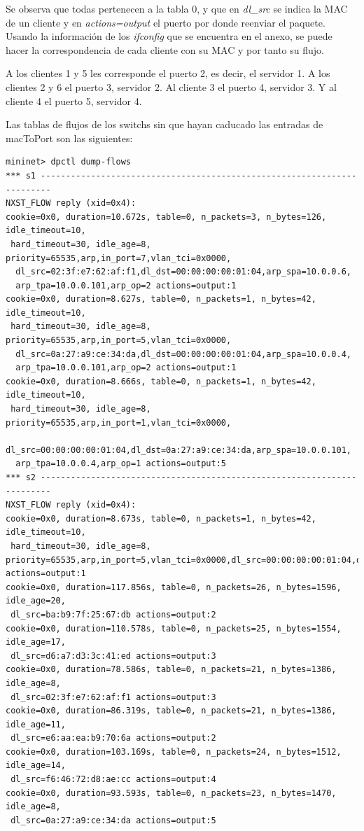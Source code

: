 \documentclass{article}
\begin{document}
Se observa que todas pertenecen a la tabla 0, y que en \textit{dl\_src} se indica la MAC de un cliente y en \textit{actions=output} el puerto por donde reenviar el paquete. Usando la información de los \textit{ifconfig} que se encuentra en el anexo, se puede hacer la correspondencia de cada cliente con su MAC y por tanto su flujo.

A los clientes 1 y 5 les corresponde el puerto 2, es decir, el servidor 1. A los clientes 2 y 6 el puerto 3, servidor 2. Al cliente 3 el puerto 4, servidor 3. Y al cliente 4 el puerto 5, servidor 4.


\hfill

Las tablas de flujos de los switchs sin que hayan caducado las entradas de macToPort son las siguientes:

\begin{Verbatim}
mininet> dpctl dump-flows
*** s1 ------------------------------------------------------------------------
NXST_FLOW reply (xid=0x4):
cookie=0x0, duration=10.672s, table=0, n_packets=3, n_bytes=126, idle_timeout=10,
 hard_timeout=30, idle_age=8, priority=65535,arp,in_port=7,vlan_tci=0x0000,
  dl_src=02:3f:e7:62:af:f1,dl_dst=00:00:00:00:01:04,arp_spa=10.0.0.6,
  arp_tpa=10.0.0.101,arp_op=2 actions=output:1
cookie=0x0, duration=8.627s, table=0, n_packets=1, n_bytes=42, idle_timeout=10,
 hard_timeout=30, idle_age=8, priority=65535,arp,in_port=5,vlan_tci=0x0000,
  dl_src=0a:27:a9:ce:34:da,dl_dst=00:00:00:00:01:04,arp_spa=10.0.0.4,
  arp_tpa=10.0.0.101,arp_op=2 actions=output:1
cookie=0x0, duration=8.666s, table=0, n_packets=1, n_bytes=42, idle_timeout=10,
 hard_timeout=30, idle_age=8, priority=65535,arp,in_port=1,vlan_tci=0x0000,
  dl_src=00:00:00:00:01:04,dl_dst=0a:27:a9:ce:34:da,arp_spa=10.0.0.101,
  arp_tpa=10.0.0.4,arp_op=1 actions=output:5
*** s2 ------------------------------------------------------------------------
NXST_FLOW reply (xid=0x4):
cookie=0x0, duration=8.673s, table=0, n_packets=1, n_bytes=42, idle_timeout=10,
 hard_timeout=30, idle_age=8, priority=65535,arp,in_port=5,vlan_tci=0x0000,dl_src=00:00:00:00:01:04,dl_dst=0a:27:a9:ce:34:da,arp_spa=10.0.0.101,arp_tpa=10.0.0.4,arp_op=1 actions=output:1
cookie=0x0, duration=117.856s, table=0, n_packets=26, n_bytes=1596, idle_age=20,
 dl_src=ba:b9:7f:25:67:db actions=output:2
cookie=0x0, duration=110.578s, table=0, n_packets=25, n_bytes=1554, idle_age=17,
 dl_src=d6:a7:d3:3c:41:ed actions=output:3
cookie=0x0, duration=78.586s, table=0, n_packets=21, n_bytes=1386, idle_age=8,
 dl_src=02:3f:e7:62:af:f1 actions=output:3
cookie=0x0, duration=86.319s, table=0, n_packets=21, n_bytes=1386, idle_age=11,
 dl_src=e6:aa:ea:b9:70:6a actions=output:2
cookie=0x0, duration=103.169s, table=0, n_packets=24, n_bytes=1512, idle_age=14,
 dl_src=f6:46:72:d8:ae:cc actions=output:4
cookie=0x0, duration=93.593s, table=0, n_packets=23, n_bytes=1470, idle_age=8,
 dl_src=0a:27:a9:ce:34:da actions=output:5
\end{Verbatim}
\end{document}
